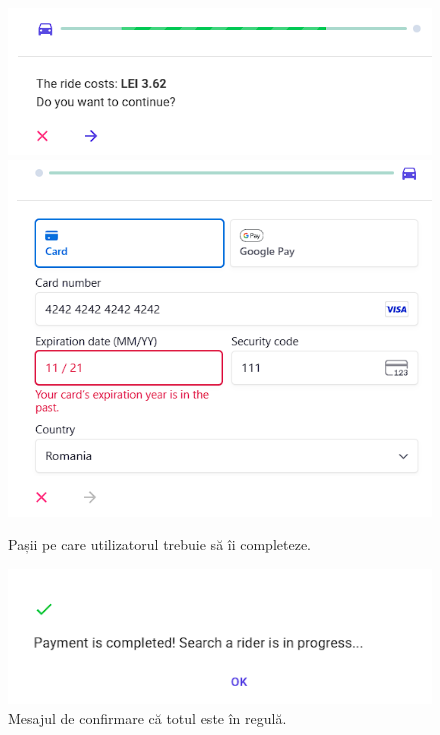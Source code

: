 \begin{figure}[H]
    \centering
    \includegraphics[width=14cm]{Assets/acceptRideUser.png}
    \includegraphics[width=14cm]{Assets/card.png}
    \caption{Pașii pe care utilizatorul trebuie să îi completeze.}
    \label{fig:paymentStep12}
\end{figure}

\begin{figure}[H]
    \centering
    \includegraphics[width=14cm]{Assets/donePayment.png}
    \caption{Mesajul de confirmare că totul este în regulă.}
    \label{fig:paymentStep3}
\end{figure}

